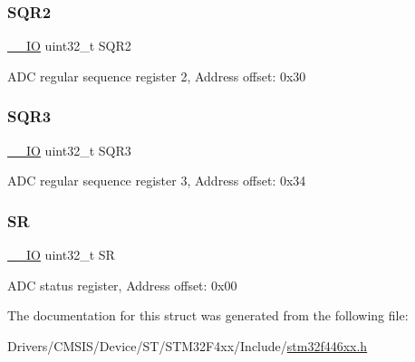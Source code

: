 \subsubsection{\texorpdfstring{S\+Q\+R2}{SQR2}}
{\footnotesize\ttfamily \mbox{\hyperlink{core__sc300_8h_aec43007d9998a0a0e01faede4133d6be}{\+\_\+\+\_\+\+IO}} uint32\+\_\+t S\+Q\+R2}

A\+DC regular sequence register 2, Address offset\+: 0x30 \mbox{\label{struct_a_d_c___type_def_a97e40d9928fa25a5628d6442f0aa6c0f}} 
\subsubsection{\texorpdfstring{S\+Q\+R3}{SQR3}}
{\footnotesize\ttfamily \mbox{\hyperlink{core__sc300_8h_aec43007d9998a0a0e01faede4133d6be}{\+\_\+\+\_\+\+IO}} uint32\+\_\+t S\+Q\+R3}

A\+DC regular sequence register 3, Address offset\+: 0x34 \mbox{\label{struct_a_d_c___type_def_af6aca2bbd40c0fb6df7c3aebe224a360}} 
\subsubsection{\texorpdfstring{SR}{SR}}
{\footnotesize\ttfamily \mbox{\hyperlink{core__sc300_8h_aec43007d9998a0a0e01faede4133d6be}{\+\_\+\+\_\+\+IO}} uint32\+\_\+t SR}

A\+DC status register, Address offset\+: 0x00 

The documentation for this struct was generated from the following file\+:\begin{DoxyCompactItemize}
\item 
Drivers/\+C\+M\+S\+I\+S/\+Device/\+S\+T/\+S\+T\+M32\+F4xx/\+Include/\mbox{\hyperlink{stm32f446xx_8h}{stm32f446xx.\+h}}\end{DoxyCompactItemize}
